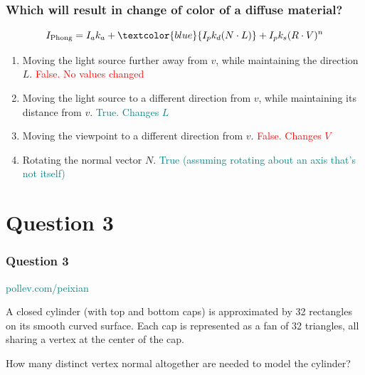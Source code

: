 \documentclass{beamer}
\begin{document}
\begin{frame}
    \frametitle{Which will result in change of color of a diffuse material?}

    \begin{equation*}
        I_\text{Phong} = I_a k_a + \textcolor{blue}{I_p k_d  (N \cdot L)} + I_p k_s (R \cdot V)^n
    \end{equation*}

    \begin{enumerate}
        \item Moving the light source further away from $v$, while maintaining the direction $L$. \textcolor{red}{False. No values changed}
        \item Moving the light source to a different direction from $v$, while maintaining its distance from $v$. \textcolor{teal}{True. Changes $L$}
        \item Moving the viewpoint to a different direction from $v$. \textcolor{red}{False. Changes $V$}
        \item Rotating the normal vector $N$. \textcolor{teal}{True (assuming rotating about an axis that's not itself)}
    \end{enumerate}

\end{frame}

\section{Question 3}

\begin{frame}
    \frametitle{Question 3}

    \begin{tcolorbox}[colback=teal!5!white]
        \textcolor{teal}{pollev.com/peixian}
    \end{tcolorbox}
    \vspace*{1em}

    A closed cylinder (with top and bottom caps) is approximated by 32 rectangles on its 
    smooth curved surface. 
    Each cap is represented as a fan of 32 triangles, 
    all sharing a vertex at the center of the cap. 

    \vspace*{1em}

    How many distinct vertex normal altogether are needed to model the cylinder?

\end{frame}
\end{document}
